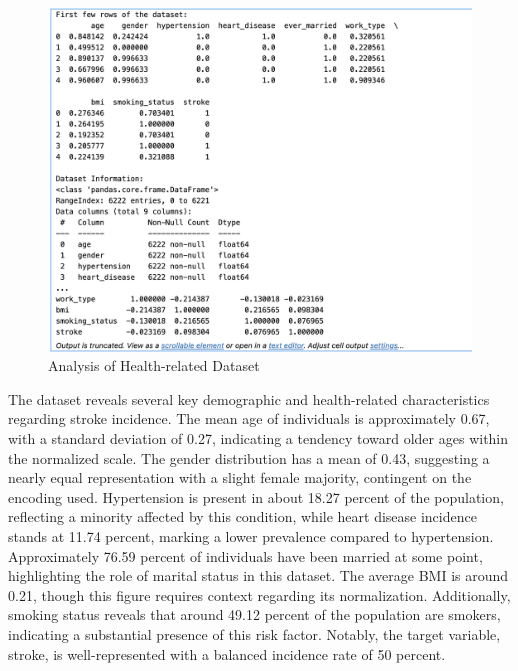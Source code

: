 \documentclass[runningheads]{llncs}
\begin{document}
\begin{enumerate}
\begin{figure}
    \centering
    \includegraphics[width=1.0\linewidth]{eda.png}
    \caption{Analysis of Health-related Dataset} 
    \label{fig:enter-label}
\end{figure}

The dataset reveals several key demographic and health-related characteristics regarding stroke incidence. The mean age of individuals is approximately 0.67, with a standard deviation of 0.27, indicating a tendency toward older ages within the normalized scale. The gender distribution has a mean of 0.43, suggesting a nearly equal representation with a slight female majority, contingent on the encoding used. Hypertension is present in about 18.27 percent of the population, reflecting a minority affected by this condition, while heart disease incidence stands at 11.74 percent, marking a lower prevalence compared to hypertension. Approximately 76.59 percent of individuals have been married at some point, highlighting the role of marital status in this dataset. The average BMI is around 0.21, though this figure requires context regarding its normalization. Additionally, smoking status reveals that around 49.12 percent of the population are smokers, indicating a substantial presence of this risk factor. Notably, the target variable, stroke, is well-represented with a balanced incidence rate of 50 percent.


\end{enumerate}
\end{document}
